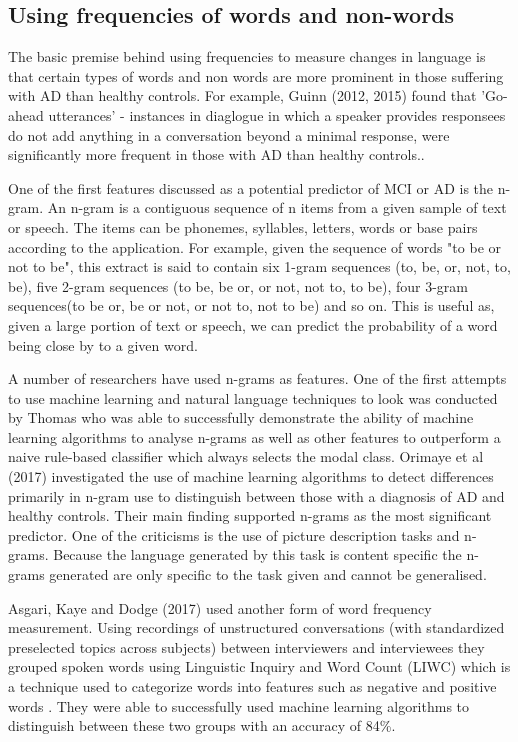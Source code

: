\documentclass[a4paper]{article}
\begin{document}
\subsection{Using frequencies of words and non-words}
The basic premise behind using frequencies to measure changes in language is that certain types of words and non words are more prominent in those suffering with AD than healthy controls. For example, Guinn (2012, 2015) \cite{Guinn2012, Guinn2015} found that 'Go-ahead utterances' - instances in diaglogue in which a speaker provides responsees do not add anything in a conversation beyond a minimal response, were significantly more frequent in those with AD than healthy controls..\newline 
\par
One of the first features discussed as a potential predictor of MCI or AD is the n-gram. An n-gram is a contiguous sequence of n items from a given sample of text or speech. The items can be phonemes, syllables, letters, words or base pairs according to the application. For example, given the sequence of words "to be or not to be", this extract is said to contain six 1-gram sequences (to, be, or, not, to, be), five 2-gram sequences (to be, be or, or not, not to, to be), four 3-gram sequences(to be or, be or not, or not to, not to be) and so on. This is useful as, given a large portion of text or speech, we can predict the probability of a word being close by to a given word. \newline  
\par
A number of researchers have used n-grams as features. One of the first attempts to use machine learning and natural language techniques to look was conducted by Thomas \cite{Thomas2005} who was able to successfully demonstrate the ability of machine learning algorithms to analyse n-grams as well as other features to outperform a naive rule-based classifier which always selects the modal class. Orimaye et al (2017) \cite{Orimaye2017} investigated the use of machine learning algorithms to detect differences primarily in n-gram use to distinguish between those with a diagnosis of AD and healthy controls. Their main finding supported n-grams as the most significant predictor. One of the criticisms is the use of picture description tasks and n-grams. Because the language generated by this task is content specific the n-grams generated are only specific to the task given and cannot be generalised.  \newline
\par
Asgari, Kaye and Dodge (2017) \cite{Asgari2017} used another form of word frequency measurement. Using recordings of unstructured conversations (with standardized preselected topics across subjects) between interviewers and interviewees they grouped spoken words using Linguistic Inquiry and Word Count (LIWC) which is a technique used to categorize words into features such as negative and positive words \cite{Pennebaker2015}. They were able to successfully used machine learning algorithms to distinguish between these two groups with an accuracy of 84\%. \newline
\par
\end{document}

